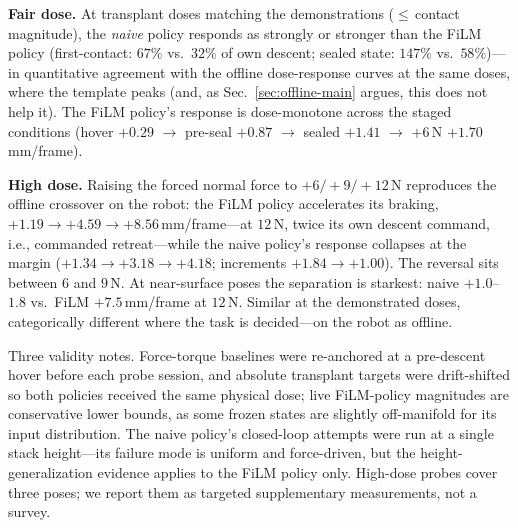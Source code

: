\textbf{Fair dose.} At transplant doses matching the demonstrations ($\leq$\,contact
magnitude), the \emph{naive} policy responds as strongly or stronger than the FiLM
policy (first-contact: $67\%$ vs.\ $32\%$ of own descent; sealed state: $147\%$ vs.\
$58\%$)---in quantitative agreement with the offline dose-response curves at the same doses,
where the template peaks (and, as Sec.~\ref{sec:offline-main} argues, this does not help it).
The FiLM policy's response is dose-monotone across the staged conditions (hover $+0.29$
$\rightarrow$ pre-seal $+0.87$ $\rightarrow$ sealed $+1.41$ $\rightarrow$ $+6$\,N
$+1.70$\,mm/frame).

\textbf{High dose.} Raising the forced normal force to $+6/+9/+12$\,N reproduces the offline
crossover on the robot: the FiLM policy accelerates its braking, $+1.19 \rightarrow
+4.59 \rightarrow +8.56$\,mm/frame---at $12$\,N, twice its own descent command, i.e., commanded
retreat---while the naive policy's response collapses at the margin ($+1.34 \rightarrow +3.18
\rightarrow +4.18$; increments $+1.84 \rightarrow +1.00$). The reversal sits between $6$ and
$9$\,N. At near-surface poses the separation is starkest: naive $+1.0$--$1.8$ vs.\ FiLM
$+7.5$\,mm/frame at $12$\,N. Similar at the demonstrated doses, categorically different where
the task is decided---on the robot as offline.

Three validity notes. Force-torque baselines were re-anchored at a pre-descent hover before
each probe session, and absolute transplant targets were drift-shifted so both policies
received the same physical dose; live FiLM-policy magnitudes are conservative lower
bounds, as some frozen states are slightly off-manifold for its input distribution. The naive
policy's closed-loop attempts were run at a single stack height---its failure mode is uniform
and force-driven, but the height-generalization evidence applies to the FiLM policy
only. High-dose probes cover three poses; we report them as targeted supplementary
measurements, not a survey.

